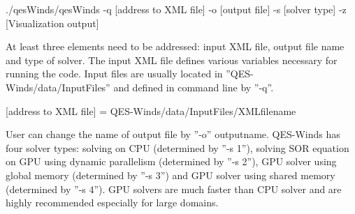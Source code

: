 ./qesWinds/qesWinds -q [address to XML file] -o [output file] -s [solver type] -z [Visualization output]
\newline

\noindent
At least three elements need to be addressed: input XML file, output file name and type of solver.
The input XML file defines various variables necessary for running the code. Input files are usually located in ''QES-Winds/data/InputFiles'' and defined in command line by ''-q''.
\newline

[address to XML file] = QES-Winds/data/InputFiles/XMLfilename
\newline

User can change the name of output file by  ''-o'' outputname.
QES-Winds has four solver types: solving on CPU (determined by ''-s 1''), solving SOR equation on GPU using dynamic parallelism (determined by ''-s 2''), GPU solver using global memory (determined by ''-s 3'') and GPU solver using shared memory (determined by ''-s 4''). GPU solvers are much faster than CPU solver and are highly recommended especially for large domains.